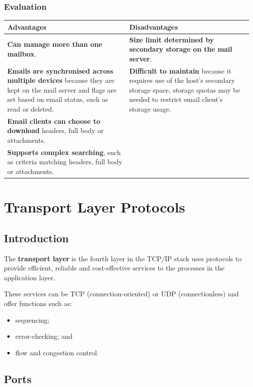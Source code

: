 \documentclass[a4paper]{systems-software}
\begin{document}
\newpage

\subsection*{Evaluation}

\begin{longtabu} to \textwidth {| X[1,l] | X[1,l] |}
	\hline
	\textbf{Advantages} & \textbf{Disadvantages}
	\\ \hline
	\textbf{Can manage more than one mailbox}. &
	\textbf{Size limit determined by secondary storage on the mail server}.
	\\ \hline
	\textbf{Emails are synchronised across multiple devices} because they are kept on the mail server and flags are set based on email status, such as read or deleted. & \textbf{Difficult to maintain} because it requires use of the host’s secondary storage space, storage quotas may be needed to restrict email client’s storage usage.
	\\ \hline
	\textbf{Email clients can choose to download} headers, full body or attachments. &
	\\ \hline
	\textbf{Supports complex searching}, such as criteria matching headers, full body or attachments. &
	\\ \hline
\end{longtabu}


\chapter{Transport Layer Protocols}
\label{chap:17}

\section{Introduction}

The \textbf{transport layer} is the fourth layer in the TCP/IP stack uses protocols to provide efficient, reliable and cost-effective services to the processes in the application layer.

These services can be TCP (connection-oriented) or UDP (connectionless) and offer functions such as:
\begin{itemize}
	\item sequencing;
	\item error-checking; and
	\item flow and congestion control.
\end{itemize}


\section{Ports}
\end{document}

